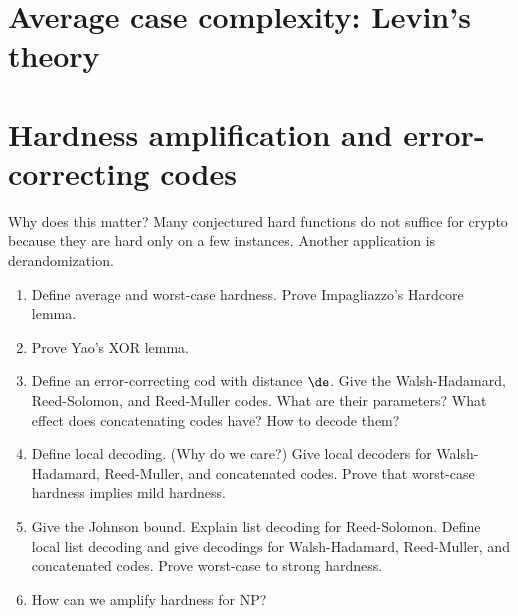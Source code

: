 \section{Average case complexity: Levin's theory}
\section{Hardness amplification and error-correcting codes}

Why does this matter? Many conjectured hard functions do not suffice for crypto because they are hard only on a few instances. Another application is derandomization.

\begin{enumerate}
\item Define average and worst-case hardness. Prove Impagliazzo's Hardcore lemma.
\item Prove Yao's XOR lemma.
\item Define an error-correcting cod with distance $\de$. Give the Walsh-Hadamard, Reed-Solomon, and Reed-Muller codes. What are their parameters? What effect does concatenating codes have? How to decode them?
\item 
Define local decoding. (Why do we care?) Give local decoders for Walsh-Hadamard, Reed-Muller, and concatenated codes. Prove that worst-case hardness implies mild hardness.
\item Give the Johnson bound. Explain list decoding for Reed-Solomon. Define local list decoding and give decodings for Walsh-Hadamard, Reed-Muller, and concatenated codes. Prove worst-case to strong hardness.
\item How can we amplify hardness for NP?
\end{enumerate}
